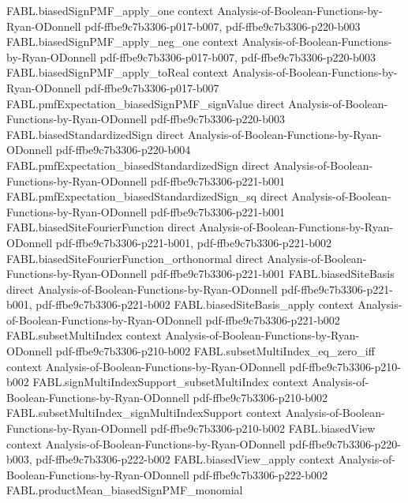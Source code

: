 \begin{theorem}
\proofstep
  {FABL.biasedSignPMF_apply_one}
  {context}
  {Analysis-of-Boolean-Functions-by-Ryan-ODonnell}
  {pdf-ffbe9c7b3306-p017-b007,
    pdf-ffbe9c7b3306-p220-b003}
\proofstep
  {FABL.biasedSignPMF_apply_neg_one}
  {context}
  {Analysis-of-Boolean-Functions-by-Ryan-ODonnell}
  {pdf-ffbe9c7b3306-p017-b007,
    pdf-ffbe9c7b3306-p220-b003}
\proofstep
  {FABL.biasedSignPMF_apply_toReal}
  {context}
  {Analysis-of-Boolean-Functions-by-Ryan-ODonnell}
  {pdf-ffbe9c7b3306-p017-b007}
\proofstep
  {FABL.pmfExpectation_biasedSignPMF_signValue}
  {direct}
  {Analysis-of-Boolean-Functions-by-Ryan-ODonnell}
  {pdf-ffbe9c7b3306-p220-b003}
\proofstep
  {FABL.biasedStandardizedSign}
  {direct}
  {Analysis-of-Boolean-Functions-by-Ryan-ODonnell}
  {pdf-ffbe9c7b3306-p220-b004}
\proofstep
  {FABL.pmfExpectation_biasedStandardizedSign}
  {direct}
  {Analysis-of-Boolean-Functions-by-Ryan-ODonnell}
  {pdf-ffbe9c7b3306-p221-b001}
\proofstep
  {FABL.pmfExpectation_biasedStandardizedSign_sq}
  {direct}
  {Analysis-of-Boolean-Functions-by-Ryan-ODonnell}
  {pdf-ffbe9c7b3306-p221-b001}
\proofstep
  {FABL.biasedSiteFourierFunction}
  {direct}
  {Analysis-of-Boolean-Functions-by-Ryan-ODonnell}
  {pdf-ffbe9c7b3306-p221-b001,
    pdf-ffbe9c7b3306-p221-b002}
\proofstep
  {FABL.biasedSiteFourierFunction_orthonormal}
  {direct}
  {Analysis-of-Boolean-Functions-by-Ryan-ODonnell}
  {pdf-ffbe9c7b3306-p221-b001}
\proofstep
  {FABL.biasedSiteBasis}
  {direct}
  {Analysis-of-Boolean-Functions-by-Ryan-ODonnell}
  {pdf-ffbe9c7b3306-p221-b001,
    pdf-ffbe9c7b3306-p221-b002}
\proofstep
  {FABL.biasedSiteBasis_apply}
  {context}
  {Analysis-of-Boolean-Functions-by-Ryan-ODonnell}
  {pdf-ffbe9c7b3306-p221-b002}
\proofstep
  {FABL.subsetMultiIndex}
  {context}
  {Analysis-of-Boolean-Functions-by-Ryan-ODonnell}
  {pdf-ffbe9c7b3306-p210-b002}
\proofstep
  {FABL.subsetMultiIndex_eq_zero_iff}
  {context}
  {Analysis-of-Boolean-Functions-by-Ryan-ODonnell}
  {pdf-ffbe9c7b3306-p210-b002}
\proofstep
  {FABL.signMultiIndexSupport_subsetMultiIndex}
  {context}
  {Analysis-of-Boolean-Functions-by-Ryan-ODonnell}
  {pdf-ffbe9c7b3306-p210-b002}
\proofstep
  {FABL.subsetMultiIndex_signMultiIndexSupport}
  {context}
  {Analysis-of-Boolean-Functions-by-Ryan-ODonnell}
  {pdf-ffbe9c7b3306-p210-b002}
\proofstep
  {FABL.biasedView}
  {context}
  {Analysis-of-Boolean-Functions-by-Ryan-ODonnell}
  {pdf-ffbe9c7b3306-p220-b003,
    pdf-ffbe9c7b3306-p222-b002}
\proofstep
  {FABL.biasedView_apply}
  {context}
  {Analysis-of-Boolean-Functions-by-Ryan-ODonnell}
  {pdf-ffbe9c7b3306-p222-b002}
\proofstep
  {FABL.productMean_biasedSignPMF_monomial}

\end{theorem}
